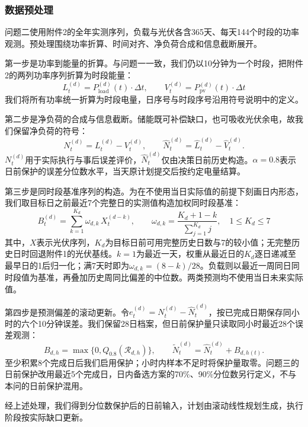 \subsubsection{数据预处理}

问题二使用附件2的全年实测序列，负载与光伏各含365天、每天144个时段的功率观测。预处理围绕功率折算、时间对齐、净负荷合成和信息截断展开。

第一步是功率到能量的折算。与问题一一致，我们仍以10分钟为一个时段，把附件2的两列功率序列折算为时段能量：
\begin{equation}\label{eq:src12}
    L_{t}^{(d)}=P_{\text{load}}^{(d)}(t)\cdot \Delta t,\qquad V_{t}^{(d)}=P_{\text{pv}}^{(d)}(t)\cdot \Delta t
\end{equation}
我们将所有功率统一折算为时段电量，日序号与时段序号沿用符号说明中的定义。

第二步是净负荷的合成与信息截断。储能既可补偿缺口，也可吸收光伏余电，故我们保留净负荷的符号：
\begin{equation}\label{eq:src13}
    N_t^{(d)}=L_t^{(d)}-V_t^{(d)},\qquad \hat N_t^{(d)}=\hat L_t^{(d)}-\hat V_t^{(d)}.
\end{equation}
$N_t^{(d)}$用于实际执行与事后误差评价，$\hat N_t^{(d)}$仅由决策日前历史构造。$\alpha=0.8$表示日前保护的误差分位数水平，当天原计划提交后按约定电量结算。

第三步是同时段基准序列的构造。为在不使用当日实际值的前提下刻画日内形态，我们取目标日之前最近7个完整日的实测值构造加权同时段基准：
\begin{equation}\label{eq:src14}
    B_{t}^{(d)}=\sum_{k=1}^{K_d}\omega_{d,k}\,X_{t}^{(d-k)},\qquad
    \omega_{d,k}=\frac{K_d+1-k}{\sum_{j=1}^{K_d}j},\quad 1\le K_d\le7
\end{equation}
其中，$X$表示光伏序列，$K_d$为目标日前可用完整历史日数与7的较小值；无完整历史日时回退附件1的光伏基线。$k=1$为最近一天，权重从最近日的$K_d$逐日递减至最早日的1后归一化；满7天时即为$\omega_{d,k}=(8-k)/28$。负载则以最近一周同日同时段值为基准，再叠加历史周同比偏差的中位数。两类预测均不使用当日未来实际值。

第四步是预测偏差的滚动更新。令$e_t^{(d)}=N_t^{(d)}-\hat N_t^{(d)}$，按已完成日期保存同小时的六个10分钟误差。我们保留28日档案，但日前保护量只读取同小时最近28个误差观测：
\begin{equation}\label{eq:src15}
 B_{d,h}=\max\{0,Q_{0.8}(\mathcal R_{d,h})\},\qquad
 \widetilde N_t^{(d)}=\hat N_t^{(d)}+B_{d,h(t)}.
\end{equation}
至少积累8个完成日后我们启用保护；小时内样本不足时将保护量取零。问题三的日前保护改用最近5个完成日，日内备选方案的70\%、90\%分位数另行定义，不与本问的日前保护混用。

经上述处理，我们得到分位数保护后的日前输入，计划由滚动线性规划生成，执行阶段按实际缺口更新。


